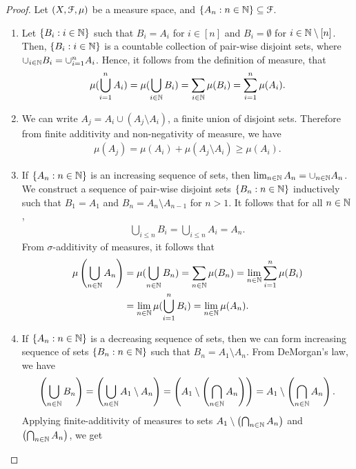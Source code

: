 \documentclass[a4paper,english,12pt]{article}
\begin{document}
\begin{proof} Let $(X, \mathcal{F}, \mu)$ be a measure space, and $\{A_n: n \in \mathbb{N} \} \subseteq \mathcal{F}$.
\begin{enumerate}
	\item Let $\{B_i: i \in \mathbb{N}\}$ such that $B_i = A_i$ for $i \in [n]$ and $B_i = \emptyset$ for $i \in \mathbb{N} \setminus [n]$. Then, $\{B_i: i \in \mathbb{N}\}$ is a countable collection of pair-wise disjoint sets, where $\cup_{i \in \mathbb{N}}B_i = \cup_{i=1}^n A_i$. Hence, it follows from the definition of measure, that 
	\begin{align*}
	\mu(\bigcup_{i=1}^n A_i) = \mu(\bigcup_{i \in \mathbb{N}}B_i) = \sum_{i \in \mathbb{N}}\mu(B_i) = \sum_{i=1}^n\mu(A_i).
	\end{align*}
	\item We can write $A_j = A_i \cup (A_j \setminus A_i)$, a finite union of disjoint sets. Therefore from finite additivity and non-negativity of measure, we have
	\begin{align*}
	\mu(A_j) = \mu(A_i) +  \mu(A_j \setminus A_i) \geq \mu(A_i).
	\end{align*}
	\item If $\{A_n: n \in \mathbb{N}\}$ is an increasing sequence of sets, then $\lim_{n \in \mathbb{N}}A_n = \cup_{n \in \mathbb{N}}A_n$. We construct a sequence of pair-wise disjoint sets $\{B_n: n \in \mathbb{N}\}$ inductively such that $B_1 = A_1$ and $B_n = A_n \setminus A_{n-1}$ for $n > 1$. It follows that for all $n \in \mathbb{N}$,
	\begin{align*}
	\bigcup_{i \leq n}B_i = \bigcup_{i \leq n}A_i = A_n. 
	\end{align*}
	From $\sigma$-additivity of measures, it follows that
	\begin{align*}
	\mu\left(\bigcup_{n \in \mathbb{N}} A_n\right) &= \mu(\bigcup_{n \in \mathbb{N}} B_n) = \sum_{n \in \mathbb{N}}\mu(B_n) = \lim_{n \in \mathbb{N}}\sum_{i=1}^n\mu(B_i)\\&= \lim_{n \in \mathbb{N}}\mu(\bigcup_{i=1}^nB_i) = \lim_{n \in \mathbb{N}}\mu(A_n).
	\end{align*}
	\item If $\{A_n: n \in \mathbb{N}\}$ is a decreasing sequence of sets, then we can form increasing sequence of sets $\{B_n: n \in \mathbb{N}\}$ such that $B_n = A_1 \setminus A_n$. From DeMorgan's law, we have	
	\begin{align*}
	\left(\bigcup_{n \in \mathbb{N}} B_n\right) = \left(\bigcup_{n \in \mathbb{N}} A_1 \setminus A_n\right) = \left(A_1 \setminus \left(\bigcap_{n \in \mathbb{N}} A_n\right)\right) = A_1 \setminus \left(\bigcap_{n \in \mathbb{N}} A_n\right).
	\end{align*} 
	Applying finite-additivity of measures to sets $A_1 \setminus \left(\bigcap_{n \in \mathbb{N}} A_n\right)$ and $\left(\bigcap_{n \in \mathbb{N}} A_n\right)$, we get

\end{enumerate}
\end{proof}
\end{document}
